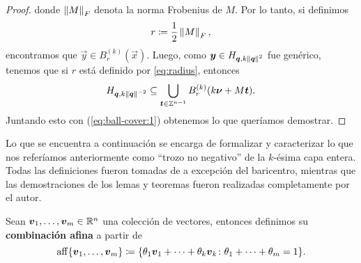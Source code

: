 \begin{proof}
	donde $\left\lVert M \right\rVert_F$ denota la norma Frobenius de $M$. Por lo tanto, si definimos
	\begin{equation}
		\label{eq:radius}
		r \coloneq \frac{1}{2}\left\lVert M \right\rVert_F,
	\end{equation}
	encontramos que $\vec{y} \in B_r^{(k)}(\vec{x})$. Luego, como $\boldsymbol{y} \in H_{\boldsymbol{q},
	k\left\lVert \boldsymbol{q} \right\rVert^2}$ fue genérico, tenemos que si $r$ está definido por \eqref{eq:radius},
	entonces
	\begin{equation}
		\label{eq:ball-cover:2}
		H_{\boldsymbol{q}, k\left\lVert \boldsymbol{q} \right\rVert^{-2}} \subseteq
		\bigcup_{\boldsymbol{t} \in \mathbb{Z}^{n-1}}B_r^{(k)}(k\boldsymbol{\nu} + M\boldsymbol{t}).
	\end{equation}
	Juntando esto con (\ref{eq:ball-cover:1}) obtenemos lo que queríamos demostrar.
\end{proof}

Lo que se encuentra a continuación se encarga de formalizar y caracterizar lo que nos referíamos
anteriormente como ``trozo no negativo'' de la $k$-ésima capa entera. Todas las definiciones fueron
tomadas de \cite{boyd} a excepción del baricentro, mientras que las demostraciones de los lemas y
teoremas fueron realizadas completamente por el autor.
\begin{definition}
	\label{def:aff}
	Sean $\boldsymbol{v}_1, \ldots, \boldsymbol{v}_m \in \mathbb{R}^n$ una colección de vectores,
	entonces definimos su \textbf{combinación afina} a partir de
	\begin{equation*}
		\operatorname{aff}\lbrace \boldsymbol{v}_1, \ldots, \boldsymbol{v}_m \rbrace \coloneq \lbrace \theta_1\boldsymbol{v}_1 + \cdots + \theta_k\boldsymbol{v}_k
		\colon \theta_1 + \cdots + \theta_m = 1 \rbrace.
	\end{equation*}
\end{definition}

